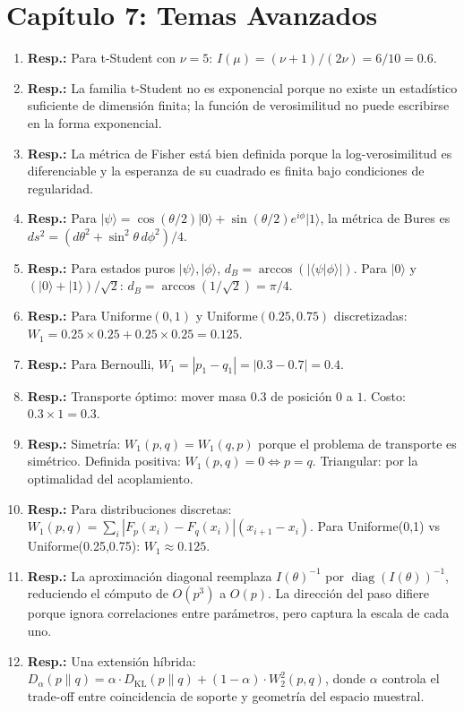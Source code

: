 \section*{Capítulo 7: Temas Avanzados}

\begin{enumerate}
	\item \textbf{Resp.:} Para t-Student con $\nu = 5$: $I(\mu) = (\nu+1)/(2\nu) = 6/10 = 0.6$.
	\item \textbf{Resp.:} La familia t-Student no es exponencial porque no existe un estadístico suficiente de dimensión finita; la función de verosimilitud no puede escribirse en la forma exponencial.
	\item \textbf{Resp.:} La métrica de Fisher está bien definida porque la log-verosimilitud es diferenciable y la esperanza de su cuadrado es finita bajo condiciones de regularidad.
	\item \textbf{Resp.:} Para $|\psi\rangle = \cos(\theta/2)|0\rangle + \sin(\theta/2)e^{i\phi}|1\rangle$, la métrica de Bures es $ds^2 = (d\theta^2 + \sin^2\theta \, d\phi^2)/4$.
	\item \textbf{Resp.:} Para estados puros $|\psi\rangle, |\phi\rangle$, $d_B = \arccos(|\langle\psi|\phi\rangle|)$. Para $|0\rangle$ y $(|0\rangle+|1\rangle)/\sqrt{2}$: $d_B = \arccos(1/\sqrt{2}) = \pi/4$.
	\item \textbf{Resp.:} Para $\mathrm{Uniforme}(0,1)$ y $\mathrm{Uniforme}(0.25,0.75)$ discretizadas: $W_1 = 0.25 \times 0.25 + 0.25 \times 0.25 = 0.125$.
	\item \textbf{Resp.:} Para Bernoulli, $W_1 = |p_1 - q_1| = |0.3 - 0.7| = 0.4$.
	\item \textbf{Resp.:} Transporte óptimo: mover masa $0.3$ de posición $0$ a $1$.  Costo: $0.3 \times 1 = 0.3$.
	\item \textbf{Resp.:} Simetría: $W_1(p,q) = W_1(q,p)$ porque el problema de transporte es simétrico.  Definida positiva: $W_1(p,q) = 0 \iff p = q$.  Triangular: por la optimalidad del acoplamiento.
	\item \textbf{Resp.:} Para distribuciones discretas: $W_1(p,q) = \sum_i |F_p(x_i) - F_q(x_i)| (x_{i+1}-x_i)$. Para Uniforme(0,1) vs Uniforme(0.25,0.75): $W_1 \approx 0.125$.
	\item \textbf{Resp.:} La aproximación diagonal reemplaza $I(\theta)^{-1}$ por $\operatorname{diag}(I(\theta))^{-1}$, reduciendo el cómputo de $O(p^3)$ a $O(p)$. La dirección del paso difiere porque ignora correlaciones entre parámetros, pero captura la escala de cada uno.
	\item \textbf{Resp.:} Una extensión híbrida: $D_\alpha(p\|q) = \alpha \cdot D_{\mathrm{KL}}(p\|q) + (1-\alpha) \cdot W_2^2(p,q)$, donde $\alpha$ controla el trade-off entre coincidencia de soporte y geometría del espacio muestral.

\end{enumerate}
